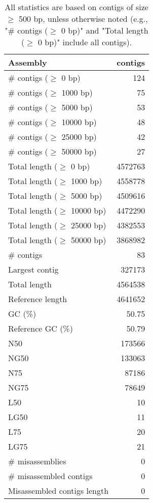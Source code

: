 \documentclass[12pt,a4paper]{article}
\begin{document}
\begin{table}[ht]
\begin{center}
\caption{All statistics are based on contigs of size $\geq$ 500 bp, unless otherwise noted (e.g., "\# contigs ($\geq$ 0 bp)" and "Total length ($\geq$ 0 bp)" include all contigs).}
\begin{tabular}{|l*{1}{|r}|}
\hline
Assembly & contigs \\ \hline
\# contigs ($\geq$ 0 bp) & 124 \\ \hline
\# contigs ($\geq$ 1000 bp) & 75 \\ \hline
\# contigs ($\geq$ 5000 bp) & 53 \\ \hline
\# contigs ($\geq$ 10000 bp) & 48 \\ \hline
\# contigs ($\geq$ 25000 bp) & 42 \\ \hline
\# contigs ($\geq$ 50000 bp) & 27 \\ \hline
Total length ($\geq$ 0 bp) & 4572763 \\ \hline
Total length ($\geq$ 1000 bp) & 4558778 \\ \hline
Total length ($\geq$ 5000 bp) & 4509616 \\ \hline
Total length ($\geq$ 10000 bp) & 4472290 \\ \hline
Total length ($\geq$ 25000 bp) & 4382553 \\ \hline
Total length ($\geq$ 50000 bp) & 3868982 \\ \hline
\# contigs & 83 \\ \hline
Largest contig & 327173 \\ \hline
Total length & 4564538 \\ \hline
Reference length & 4641652 \\ \hline
GC (\%) & 50.75 \\ \hline
Reference GC (\%) & 50.79 \\ \hline
N50 & 173566 \\ \hline
NG50 & 133063 \\ \hline
N75 & 87186 \\ \hline
NG75 & 78649 \\ \hline
L50 & 10 \\ \hline
LG50 & 11 \\ \hline
L75 & 20 \\ \hline
LG75 & 21 \\ \hline
\# misassemblies & 0 \\ \hline
\# misassembled contigs & 0 \\ \hline
Misassembled contigs length & 0 \\ \hline

\end{tabular}
\end{center}
\end{table}
\end{document}
